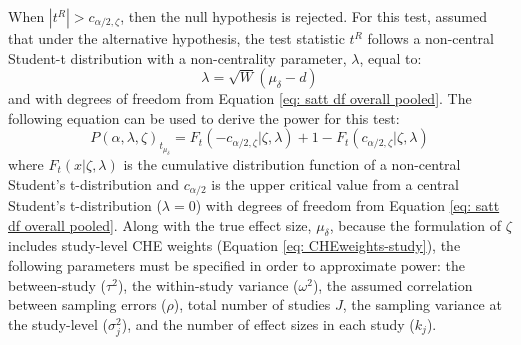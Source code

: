 When  $|t^R| > c_{\alpha/2, \zeta}$, then the null hypothesis is rejected. For this test, \textcite{vembye2023} assumed that under the alternative hypothesis, the test statistic $t^R$ follows a non-central Student-t distribution with a non-centrality parameter, $\lambda$, equal to:
\begin{equation}
    \lambda =\sqrt{W}(\mu_{\delta} -d)
\end{equation}
and with degrees of freedom from Equation \ref{eq: satt df overall pooled}. The following equation can be used to derive the power for this test:
\begin{equation}
    P(\alpha, \lambda, \zeta)_{t_{\mu_{\delta}}} = F_t(-c_{\alpha/2, \zeta}|\zeta,\lambda) + 1 - F_t(c_{\alpha/2, \zeta}|\zeta,\lambda)
\end{equation}
where $F_t(x|\zeta,\lambda)$ is the cumulative distribution function of a non-central Student's t-distribution and $c_{\alpha/2}$ is the upper critical value from a central Student's t-distribution ($\lambda = 0$) with degrees of freedom from Equation \ref{eq: satt df overall pooled}. Along with the true effect size, $\mu_{\delta}$, because the formulation of $\zeta$ includes study-level CHE weights (Equation \ref{eq: CHEweights-study}), the following parameters must be specified in order to approximate power:  the between-study ($\tau^2$), the within-study variance ($\omega^2$), the assumed correlation between sampling errors ($\rho$), total number of studies $J$, the sampling variance at the study-level ($\sigma^2_j$), and the number of effect sizes in each study ($k_j$).





